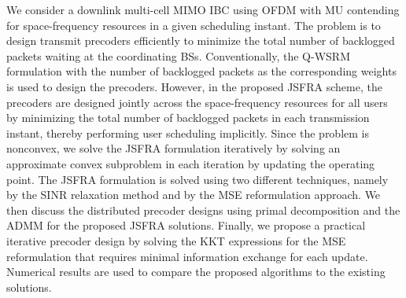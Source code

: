 We consider a downlink multi-cell \ac{MIMO} \ac{IBC} using \ac{OFDM} with \acl{MU} contending for space-frequency resources in a given scheduling instant. The problem is to design transmit precoders efficiently to minimize the total number of backlogged packets waiting at the coordinating \acp{BS}. Conventionally, the \ac{Q-WSRM} formulation with the number of backlogged packets as the corresponding weights is used to design the precoders. However, in the proposed \ac{JSFRA} scheme, the precoders are designed jointly across the space-frequency resources for all users by minimizing the total number of backlogged packets in each transmission instant, thereby performing user scheduling implicitly. Since the problem is nonconvex, we solve the \ac{JSFRA} formulation iteratively by solving an approximate convex subproblem in each iteration by updating the operating point. The \ac{JSFRA} formulation is solved using two different techniques, namely by the \ac{SINR} relaxation method and by the \ac{MSE} reformulation approach. We then discuss the distributed precoder designs using primal decomposition and the \ac{ADMM} for the proposed \ac{JSFRA} solutions. Finally, we propose a practical iterative precoder design by solving the \acl{KKT} expressions for the \ac{MSE} reformulation that requires minimal information exchange for each update. Numerical results are used to compare the proposed algorithms to the existing solutions.
